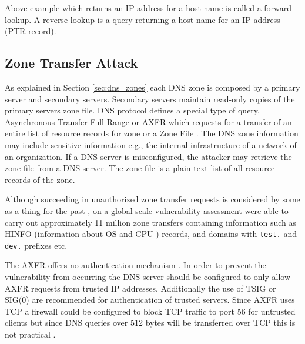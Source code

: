 Above example which returns an IP address for a host name is called a forward lookup. A reverse lookup is a query returning a host name for an IP address (PTR record).

\subsection{Zone Transfer Attack}

As explained in Section \ref{sec:dns_zones} each DNS zone is composed by a primary server and secondary servers. Secondary servers maintain read-only copies of the primary servers zone file. DNS protocol defines a special type of query, Asynchronous Transfer Full Range or AXFR which requests for a transfer of an entire list of resource records for zone or a Zone File \cite{RFC1034}. The DNS zone information may include sensitive information e.g., the internal infrastructure of a network of an organization. If a DNS server is misconfigured, the attacker may retrieve the zone file from a DNS server. The zone file is a plain text list of all resource records of the zone.

Although succeeding in unauthorized zone transfer requests is considered by some as a thing for the past \cite{network_sec_assessment}, on a global-scale vulnerability assessment  \citet{global_zone_transfer} were able to carry out approximately 11 million zone transfers containing information such as HINFO (information about OS and CPU \cite{RFC1035}) records, and domains with \texttt{test.} and \texttt{dev.} prefixes etc.

The AXFR offers no authentication mechanism \cite{RFC1035}\cite{RFC5936}. In order to prevent the vulnerability from occurring the DNS server should be configured to only allow AXFR requests from trusted IP addresses. Additionally the use of TSIG or SIG(0) are recommended for authentication of trusted servers\cite{RFC5936}. Since AXFR uses TCP \cite{RFC1034}\cite{RFC1035} a firewall could be configured to block TCP traffic to port 56 for untrusted clients but since DNS queries over 512 bytes will be transferred over TCP this is not practical \cite{hacking_exposed}.






